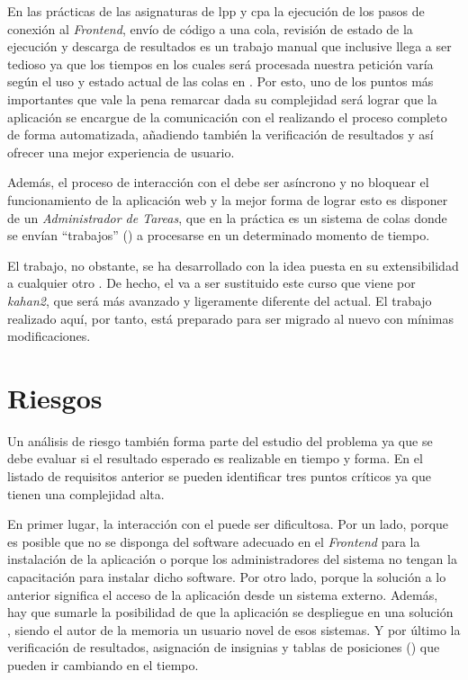 \documentclass[11pt,spanish,listoffigures,listoftables]{tfgetsinf}
\begin{document}
En las prácticas de las asignaturas de \acrshort{lpp} y \acrshort{cpa} la ejecución de los pasos de conexión al \textit{Frontend}, envío de código a una cola, revisión de estado de la ejecución y descarga de resultados es un trabajo manual que inclusive llega a ser tedioso ya que los tiempos en los cuales será procesada nuestra petición varía según el uso y estado actual de las colas en \kahan. Por esto, uno de los puntos más importantes que vale la pena remarcar dada su complejidad será lograr que la aplicación se encargue de la comunicación con el  realizando el proceso completo de forma automatizada, añadiendo también la verificación de resultados y así ofrecer una mejor experiencia de usuario. 

Además, el proceso de interacción con el  \kahan debe ser asíncrono y no bloquear el funcionamiento de la aplicación web y la mejor forma de lograr esto es disponer de un \textit{Administrador de Tareas}, que en la práctica es un sistema de colas donde se envían ``trabajos'' () a procesarse en un determinado momento de tiempo.

El trabajo, no obstante, se ha desarrollado con la idea puesta en su extensibilidad a cualquier otro . De hecho, el   \kahan va a ser sustituido este curso que viene por \textit{kahan2}, que será más avanzado y ligeramente diferente del actual. El trabajo realizado aquí, por tanto, está preparado para ser migrado al nuevo   con mínimas modificaciones.

\section{Riesgos}

Un análisis de riesgo también forma parte del estudio del problema ya que se debe evaluar si el resultado esperado es realizable en tiempo y forma. En el listado de requisitos anterior se pueden identificar tres puntos críticos ya que tienen una complejidad alta.

En primer lugar, la interacción con el  \kahan puede ser dificultosa. Por un lado, porque es posible que no se disponga del software adecuado en el \emph{Frontend} para la instalación de la aplicación o porque los administradores del sistema no tengan la capacitación para instalar dicho software. Por otro lado, porque la solución a lo anterior significa el acceso de la aplicación desde un sistema externo. Además, hay que sumarle la posibilidad de que la aplicación se despliegue en una solución , siendo el autor de la memoria un usuario novel de esos sistemas. Y por último la verificación de resultados, asignación de \gls{insignia}s y tablas de posiciones () que pueden ir cambiando en el tiempo.
\end{document}
